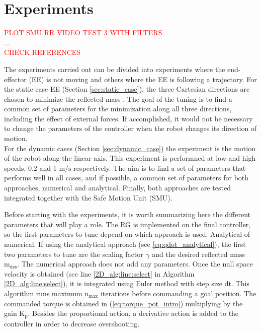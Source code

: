\chapter{Experiments}
\label{ch:experiments}

\textcolor{red}{ 
PLOT SMU RR VIDEO TEST 3 WITH FILTERS\\
...\\
CHECK REFERENCES
}



The experiments carried out can be divided into experiments where the end-effector (EE) is not moving  and others where the EE is following a trajectory. 
For the static case EE (Section \ref{sec:static_case}), the three Cartesian directions are chosen to minimize the reflected mass . The goal of the tuning is to find a common set of parameters for the minimization along all three directions, including the effect of external forces. If accomplished, it would not be necessary to change the parameters of the controller when the robot changes its direction of motion.\\
%
For the dynamic cases (Section \ref{sec:dynamic_case}) the  experiment is the motion of the robot along the linear axis. This experiment is performned at low and high speeds, 0.2 and 1 $\mathrm{m/s}$ respectively. 
The aim is to find a set of parameters that performs well in all cases, and if possible, a common set of parameters for both approaches, numerical and analytical.
Finally, both approaches are tested integrated together with the Safe Motion Unit (SMU). 

Before starting with the experiments, it is worth summarizing here the different parameters that will play a role. 
The RG is implemented on the final controller, so the first parameters to tune depend on which approach is used: Analytical of numerical. If using the analytical approach (see \ref{eq:qdot_analytical}), the first two parameters to tune are the scaling factor $\mathrm{\gamma}$ and the desired reflected mass $\mathrm{m_{des}}$. The numerical approach does not add any parameters. Once the null space velocity is obtained (see line \ref{2D_alg:line:select} in Algorithm \ref{2D_alg:line:select}), it is integrated using Euler method with step size $\mathrm{dt}$. This algorithm runs maximum $\mathrm{n_{max}}$ iterations before commanding a goal position. The commanded torque is obtained in (\ref{eq:torque_pot_intro}) multiplying by the gain $\mathrm{K_p}$. Besides the proportional action, a derivative action is added to the controller in order to decrease overshooting.



